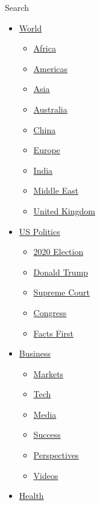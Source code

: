 Search

\begin{itemize}
\tightlist
\item
  \href{/world}{World}

  \begin{itemize}
  \tightlist
  \item
    \href{/africa}{Africa}
  \item
    \href{/americas}{Americas}
  \item
    \href{/asia}{Asia}
  \item
    \href{/australia}{Australia}
  \item
    \href{/china}{China}
  \item
    \href{/europe}{Europe}
  \item
    \href{/india}{India}
  \item
    \href{/middle-east}{Middle East}
  \item
    \href{/uk}{United Kingdom}
  \end{itemize}
\item
  \href{/politics}{US Politics}

  \begin{itemize}
  \tightlist
  \item
    \href{/election/2020}{2020 Election}
  \item
    \href{/specials/politics/president-donald-trump-45}{Donald Trump}
  \item
    \href{/specials/politics/supreme-court-nine}{Supreme Court}
  \item
    \href{/specials/politics/congress}{Congress}
  \item
    \href{/specials/politics/fact-check-politics}{Facts First}
  \end{itemize}
\item
  \href{/business}{Business}

  \begin{itemize}
  \tightlist
  \item
    \href{https://money.cnn.com/data/markets/}{Markets}
  \item
    \href{/business/tech}{Tech}
  \item
    \href{/business/media}{Media}
  \item
    \href{/business/success}{Success}
  \item
    \href{/business/perspectives}{Perspectives}
  \item
    \href{/business/videos}{Videos}
  \end{itemize}
\item
  \href{/health}{Health}


\end{itemize}
